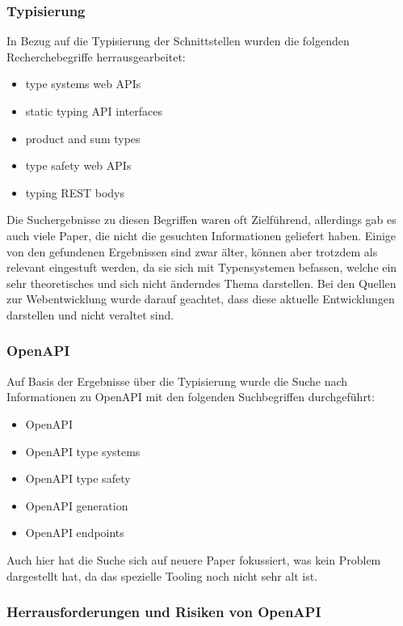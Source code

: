 \subsubsection{Typisierung}

In Bezug auf die Typisierung der Schnittstellen wurden die folgenden
Recherchebegriffe herrausgearbeitet:

\begin{itemize}
\item type systems web APIs
\item static typing API interfaces
\item product and sum types
\item type safety web APIs
\item typing REST bodys
\end{itemize}

Die Suchergebnisse zu diesen Begriffen waren oft Zielführend, allerdings gab es auch viele
Paper, die nicht die gesuchten Informationen geliefert haben.
Einige von den gefundenen Ergebnissen sind zwar älter, können aber trotzdem als
relevant eingestuft werden, da sie sich mit Typensystemen befassen, welche ein
sehr theoretisches und sich nicht änderndes Thema darstellen.
Bei den Quellen zur Webentwicklung wurde darauf geachtet, dass diese aktuelle Entwicklungen darstellen
und nicht veraltet sind.

\subsubsection{OpenAPI}

Auf Basis der Ergebnisse über die Typisierung wurde die Suche nach Informationen zu OpenAPI
mit den folgenden Suchbegriffen durchgeführt:

\begin{itemize}
\item OpenAPI
\item OpenAPI type systems
\item OpenAPI type safety
\item OpenAPI generation
\item OpenAPI endpoints
\end{itemize}

Auch hier hat die Suche sich auf neuere Paper fokussiert, was kein Problem dargestellt hat, da
das spezielle Tooling noch nicht sehr alt ist.

\subsubsection{Herrausforderungen und Risiken von OpenAPI}

